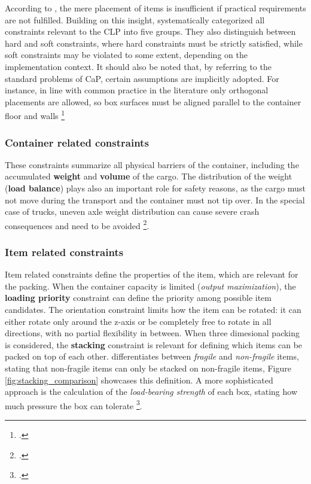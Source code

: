 According to \cite{bischoff_issues_1995}, the mere placement of items is insufficient
if practical requirements are not fulfilled. Building on this insight,
\cite{bortfeldt_constraints_2013} systematically categorized all constraints relevant
to the \gls{CLP} into five groups. They also distinguish between hard and soft constraints,
where hard constraints must be strictly satisfied, while soft constraints may be violated
to some extent, depending on the implementation context.
It should also be noted that, by referring to the standard problems of \gls{CaP},
certain assumptions are implicitly adopted. For instance, in line with common
practice in the literature only orthogonal placements are allowed, so box surfaces must be
aligned parallel to the container floor and walls \footcite[cf.][p.2]{bortfeldt_constraints_2013}

\subsubsection{Container related constraints}
These constraints summarize all physical barriers of the container, including
the accumulated \textbf{weight} and \textbf{volume} of the cargo. The distribution of the weight
(\textbf{load balance}) plays also an important role for safety reasons, as the
cargo must not move during the transport and the container must not tip over.
In the special case of trucks, uneven axle weight distribution can cause severe
crash consequences and need to be avoided \footcite[cf.][pp. 849--850]{krebs_advanced_2021}.

\subsubsection{Item related constraints}
Item related constraints define the properties of the item, which are relevant
for the packing. When the container capacity is limited (\textit{output maximization}),
the \textbf{loading priority} constraint can define the priority among possible
item candidates. The orientation constraint limits how the item
can be rotated: it can either rotate only around the z-axis or be completely
free to rotate in all directions, with no partial flexibility in between.
When three dimesional packing is considered, the \textbf{stacking} constraint
is relevant for defining which items can be packed on top of each other. \cite{gendreau_tabu_2006}
differentiates between \textit{fragile} and \textit{non-fragile} items, stating
that non-fragile items can only be stacked on non-fragile items, Figure \ref{fig:stacking_comparison} showcases
this definition. A more sophisticated approach is the calculation  of the
\textit{load-bearing strength} of each box, stating how much pressure the box
can tolerate \footcite[cf.][pp. 847--848]{krebs_advanced_2021}.

